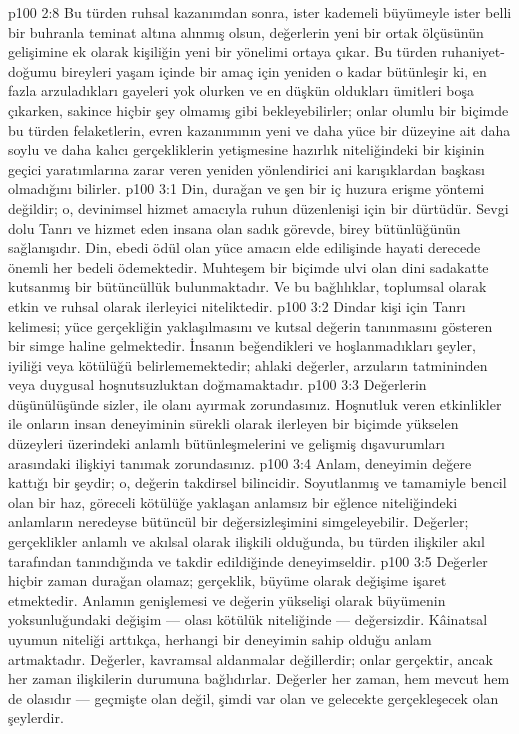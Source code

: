 \vs p100 2:8 Bu türden ruhsal kazanımdan sonra, ister kademeli büyümeyle ister belli bir buhranla teminat altına alınmış olsun, değerlerin yeni bir ortak ölçüsünün gelişimine ek olarak kişiliğin yeni bir yönelimi ortaya çıkar. Bu türden ruhaniyet\hyp{}doğumu bireyleri yaşam içinde bir amaç için yeniden o kadar bütünleşir ki, en fazla arzuladıkları gayeleri yok olurken ve en düşkün oldukları ümitleri boşa çıkarken, sakince hiçbir şey olmamış gibi bekleyebilirler; onlar olumlu bir biçimde bu türden felaketlerin, evren kazanımının yeni ve daha yüce bir düzeyine ait daha soylu ve daha kalıcı gerçekliklerin yetişmesine hazırlık niteliğindeki bir kişinin geçici yaratımlarına zarar veren yeniden yönlendirici ani karışıklardan başkası olmadığını bilirler.
\vs p100 3:1 Din, durağan ve şen bir iç huzura erişme yöntemi değildir; o, devinimsel hizmet amacıyla ruhun düzenlenişi için bir dürtüdür. Sevgi dolu Tanrı ve hizmet eden insana olan sadık görevde, birey bütünlüğünün sağlanışıdır. Din, ebedi ödül olan yüce amacın elde edilişinde hayati derecede önemli her bedeli ödemektedir. Muhteşem bir biçimde ulvi olan dini sadakatte kutsanmış bir bütüncüllük bulunmaktadır. Ve bu bağlılıklar, toplumsal olarak etkin ve ruhsal olarak ilerleyici niteliktedir.
\vs p100 3:2 Dindar kişi için Tanrı kelimesi; yüce gerçekliğin yaklaşılmasını ve kutsal değerin tanınmasını gösteren bir simge haline gelmektedir. İnsanın beğendikleri ve hoşlanmadıkları şeyler, iyiliği veya kötülüğü belirlememektedir; ahlaki değerler, arzuların tatmininden veya duygusal hoşnutsuzluktan doğmamaktadır.
\vs p100 3:3 Değerlerin düşünülüşünde sizler,  ile  olanı ayırmak zorundasınız. Hoşnutluk veren etkinlikler ile onların insan deneyiminin sürekli olarak ilerleyen bir biçimde yükselen düzeyleri üzerindeki anlamlı bütünleşmelerini ve gelişmiş dışavurumları arasındaki ilişkiyi tanımak zorundasınız.
\vs p100 3:4 Anlam, deneyimin değere kattığı bir şeydir; o, değerin takdirsel bilincidir. Soyutlanmış ve tamamiyle bencil olan bir haz, göreceli kötülüğe yaklaşan anlamsız bir eğlence niteliğindeki anlamların neredeyse bütüncül bir değersizleşimini simgeleyebilir. Değerler; gerçeklikler anlamlı ve akılsal olarak ilişkili olduğunda, bu türden ilişkiler akıl tarafından tanındığında ve takdir edildiğinde deneyimseldir.
\vs p100 3:5 Değerler hiçbir zaman durağan olamaz; gerçeklik, büyüme olarak değişime işaret etmektedir. Anlamın genişlemesi ve değerin yükselişi olarak büyümenin yoksunluğundaki değişim --- olası kötülük niteliğinde --- değersizdir. Kâinatsal uyumun niteliği arttıkça, herhangi bir deneyimin sahip olduğu anlam artmaktadır. Değerler, kavramsal aldanmalar değillerdir; onlar gerçektir, ancak her zaman ilişkilerin durumuna bağlıdırlar. Değerler her zaman, hem mevcut hem de olasıdır --- geçmişte olan değil, şimdi var olan ve gelecekte gerçekleşecek olan şeylerdir.
